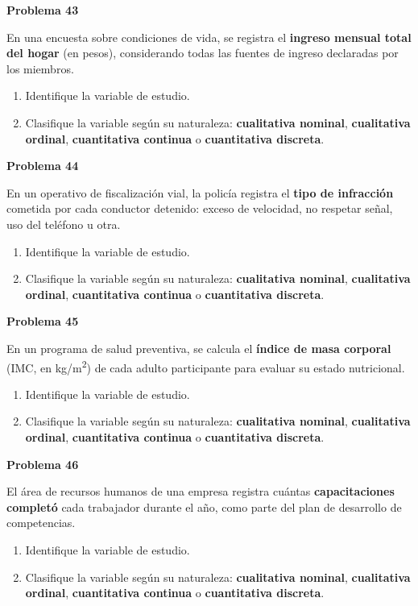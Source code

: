\documentclass[10pt,letterpaper]{article}
\newcommand{\problema}[1]{%
  \vspace{2pt}%
  \begin{tcolorbox}[
    enhanced,
    colback=white,
    colframe=black,
    arc=0pt,
    boxrule=0pt,
    leftrule=2pt,
    left=6pt, right=6pt,
    top=1pt, bottom=1pt,
  ]
    {\normalsize\bfseries\sffamily #1}
  \end{tcolorbox}%
  \vspace{1pt}%
}
\begin{document}
\problema{Problema 43}
\noindent\sffamily\small En una encuesta sobre condiciones de vida, se registra el \textbf{ingreso mensual total del hogar} (en pesos), considerando todas las fuentes de ingreso declaradas por los miembros.
\begin{enumerate}[leftmargin=1.2cm, label=\textbf{\alph*)}, itemsep=0pt, topsep=2pt]
  \item Identifique la variable de estudio.
  \item Clasifique la variable seg\'un su naturaleza: \textbf{cualitativa nominal}, \textbf{cualitativa ordinal}, \textbf{cuantitativa continua} o \textbf{cuantitativa discreta}.
\end{enumerate}

\problema{Problema 44}
\noindent\sffamily\small En un operativo de fiscalizaci\'on vial, la polic\'ia registra el \textbf{tipo de infracci\'on} cometida por cada conductor detenido: exceso de velocidad, no respetar se\~nal, uso del tel\'efono u otra.
\begin{enumerate}[leftmargin=1.2cm, label=\textbf{\alph*)}, itemsep=0pt, topsep=2pt]
  \item Identifique la variable de estudio.
  \item Clasifique la variable seg\'un su naturaleza: \textbf{cualitativa nominal}, \textbf{cualitativa ordinal}, \textbf{cuantitativa continua} o \textbf{cuantitativa discreta}.
\end{enumerate}

\problema{Problema 45}
\noindent\sffamily\small En un programa de salud preventiva, se calcula el \textbf{\'indice de masa corporal} (IMC, en kg/m\textsuperscript{2}) de cada adulto participante para evaluar su estado nutricional.
\begin{enumerate}[leftmargin=1.2cm, label=\textbf{\alph*)}, itemsep=0pt, topsep=2pt]
  \item Identifique la variable de estudio.
  \item Clasifique la variable seg\'un su naturaleza: \textbf{cualitativa nominal}, \textbf{cualitativa ordinal}, \textbf{cuantitativa continua} o \textbf{cuantitativa discreta}.
\end{enumerate}

\problema{Problema 46}
\noindent\sffamily\small El \'area de recursos humanos de una empresa registra cu\'antas \textbf{capacitaciones complet\'o} cada trabajador durante el a\~no, como parte del plan de desarrollo de competencias.
\begin{enumerate}[leftmargin=1.2cm, label=\textbf{\alph*)}, itemsep=0pt, topsep=2pt]
  \item Identifique la variable de estudio.
  \item Clasifique la variable seg\'un su naturaleza: \textbf{cualitativa nominal}, \textbf{cualitativa ordinal}, \textbf{cuantitativa continua} o \textbf{cuantitativa discreta}.
\end{enumerate}
\end{document}
